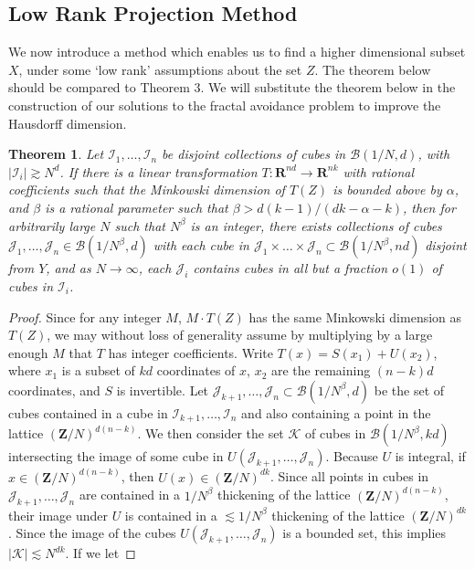 \documentclass{article}
\theoremstyle{plain}
\theoremstyle{plain}
\newtheorem{theorem}{Theorem}
\begin{document}
\begin{multicols}{2}
\section{Low Rank Projection Method}

We now introduce a method which enables us to find a higher dimensional subset $X$, under some `low rank' assumptions about the set $Z$. The theorem below should be compared to Theorem 3. We will substitute the theorem below in the construction of our solutions to the fractal avoidance problem to improve the Hausdorff dimension.

\begin{theorem}
	Let $\mathcal{I}_1, \dots, \mathcal{I}_n$ be disjoint collections of cubes in $\mathcal{B}(1/N,d)$, with $|\mathcal{I}_i| \gtrsim N^d$. If there is a linear transformation $T: \mathbf{R}^{nd} \to \mathbf{R}^{nk}$ with rational coefficients such that the Minkowski dimension of $T(Z)$ is bounded above by $\alpha$, and $\beta$ is a rational parameter such that $\beta > d(k-1)/(dk - \alpha - k)$, then for arbitrarily large $N$ such that $N^\beta$ is an integer, there exists collections of cubes $\mathcal{J}_1, \dots, \mathcal{J}_n \in \mathcal{B}(1/N^\beta,d)$ with each cube in $\mathcal{J}_1 \times \dots \times \mathcal{J}_n \subset \mathcal{B}(1/N^\beta,nd)$ disjoint from $Y$, and as $N \to \infty$, each $\mathcal{J}_i$ contains cubes in all but a fraction $o(1)$ of cubes in $\mathcal{I}_i$.
\end{theorem}
\begin{proof}
	Since for any integer $M$, $M \cdot T(Z)$ has the same Minkowski dimension as $T(Z)$, we may without loss of generality assume by multiplying by a large enough $M$ that $T$ has integer coefficients. Write $T(x) = S(x_1) + U(x_2)$, where $x_1$ is a subset of $kd$ coordinates of $x$, $x_2$ are the remaining $(n-k)d$ coordinates, and $S$ is invertible. Let $\mathcal{J}_{k+1}, \dots, \mathcal{J}_n \subset \mathcal{B}(1/N^\beta,d)$ be the set of cubes contained in a cube in $\mathcal{I}_{k+1}, \dots, \mathcal{I}_n$ and also containing a point in the lattice $(\mathbf{Z}/N)^{d(n-k)}$. We then consider the set $\mathcal{K}$ of cubes in $\mathcal{B}(1/N^\beta,kd)$ intersecting the image of some cube in $U(\mathcal{J}_{k+1}, \dots, \mathcal{J}_n)$. Because $U$ is integral, if $x \in (\mathbf{Z}/N)^{d(n-k)}$, then $U(x) \in (\mathbf{Z}/N)^{dk}$. Since all points in cubes in $\mathcal{J}_{k+1}, \dots, \mathcal{J}_n$ are contained in a $1/N^\beta$ thickening of the lattice $(\mathbf{Z}/N)^{d(n-k)}$, their image under $U$ is contained in a $\lesssim 1/N^\beta$ thickening of the lattice $(\mathbf{Z}/N)^{dk}$. Since the image of the cubes $U(\mathcal{J}_{k+1}, \dots, \mathcal{J}_n)$ is a bounded set, this implies $|\mathcal{K}| \lesssim N^{dk}$. If we let

\end{proof}
\end{multicols}
\end{document}
